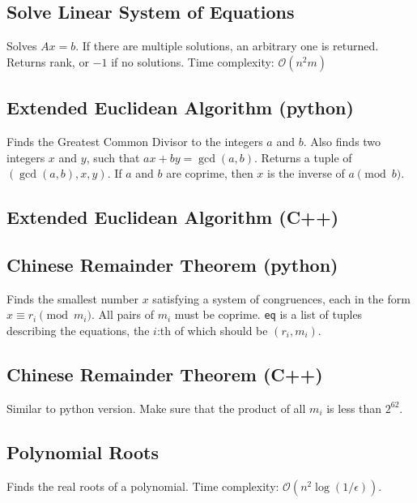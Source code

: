 \documentclass{article}
\begin{document}
\subsection*{Solve Linear System of Equations}
Solves $A x = b$. If there are multiple solutions, an arbitrary one is returned.
Returns rank, or $-1$ if no solutions. Time complexity: $\mathcal{O}(n^2 m)$



\subsection*{Extended Euclidean Algorithm (python)}
Finds the Greatest Common Divisor to the integers $a$ and $b$. Also finds two integers $x$ and $y$, such that $ax+by=\gcd(a,b)$.
Returns a tuple of $(\gcd(a, b), x, y)$. If $a$ and $b$ are coprime, then $x$ is the inverse of $a \pmod{b}$.


\subsection*{Extended Euclidean Algorithm (C++)}


\pagebreak

\subsection*{Chinese Remainder Theorem (python)}
Finds the smallest number $x$ satisfying a system of congruences, each in the form $x \equiv r_i \pmod{m_i}$. All pairs of $m_i$ must be coprime.
\lstinline{eq} is a list of tuples describing the equations, the $i$:th of which should be $(r_i, m_i)$.


\subsection*{Chinese Remainder Theorem (C++)}
Similar to python version. Make sure that the product of all $m_i$ is less than $2^{62}$.


\subsection*{Polynomial Roots}

Finds the real roots of a polynomial. Time complexity: $\mathcal{O}(n^2 \log(1/\epsilon))$.
\end{document}
